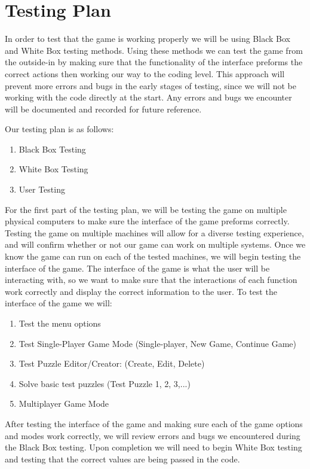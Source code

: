\documentclass[12pt]{article}
\begin{document}
\section{Testing Plan}

In order to test that the game is working properly we will be using Black Box and White Box testing methods. Using these methods we can test the game from the outside-in by making sure that the functionality of the interface preforms the correct actions then working our way to the coding level. This approach will prevent more errors and bugs in the early stages of testing, since we will not be working with the code directly at the start. Any errors and bugs we encounter will be documented and recorded for future reference.

Our testing plan is as follows:
\begin{enumerate}
\item Black Box Testing
\item White Box Testing
\item User Testing
\end{enumerate}

For the first part of the testing plan, we will be testing the game on multiple physical computers to make sure the interface of the game preforms correctly. Testing the game on multiple machines will allow for a diverse testing experience, and will confirm whether or not our game can work on multiple systems. Once we know the game can run on each of the tested machines, we will begin testing the interface of the game.
The interface of the game is what the user will be interacting with, so we want to make sure that the interactions of each function work correctly and display the correct information to the user. To test the interface of the game we will:

\begin{enumerate}
\item Test the menu options
\item Test Single-Player Game Mode (Single-player, New Game, Continue Game)
\item Test Puzzle Editor/Creator: (Create, Edit, Delete)
\item Solve basic test puzzles (Test Puzzle 1, 2, 3,...)
\item Multiplayer Game Mode
\end{enumerate}

After testing the interface of the game and making sure each of the game options and modes work correctly, we will review errors and bugs we encountered during the Black Box testing. Upon completion we will need to begin White Box testing and testing that the correct values are being passed in the code.
\end{document}
